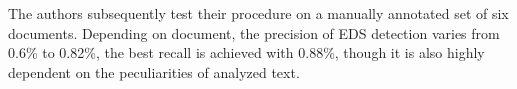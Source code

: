 \documentclass[a4paper,11pt]{article}
\begin{document}
The authors subsequently test their procedure on a manually annotated set of
six documents.  Depending on document, the precision of EDS detection varies
from 0.6\% to 0.82\%, the best recall is achieved with 0.88\%, though it is
also highly dependent on the peculiarities of analyzed text.


\end{document}
